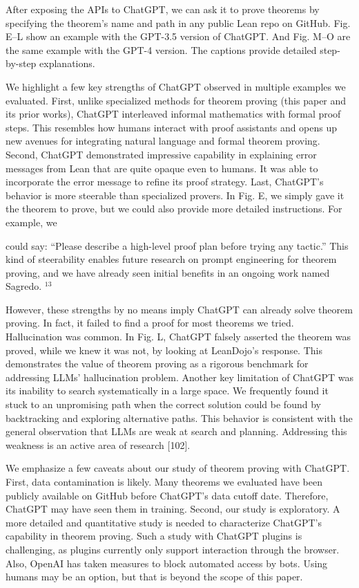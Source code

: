 \documentclass[
]{article}
\begin{document}
After exposing the APIs to ChatGPT, we can ask it to prove theorems by
specifying the theorem's name and path in any public Lean repo on
GitHub. Fig. E--L show an example with the GPT-3.5 version of ChatGPT.
And Fig. M--O are the same example with the GPT-4 version. The captions
provide detailed step-by-step explanations.

We highlight a few key strengths of ChatGPT observed in multiple
examples we evaluated. First, unlike specialized methods for theorem
proving (this paper and its prior works), ChatGPT interleaved informal
mathematics with formal proof steps. This resembles how humans interact
with proof assistants and opens up new avenues for integrating natural
language and formal theorem proving. Second, ChatGPT demonstrated
impressive capability in explaining error messages from Lean that are
quite opaque even to humans. It was able to incorporate the error
message to refine its proof strategy. Last, ChatGPT's behavior is more
steerable than specialized provers. In Fig. E, we simply gave it the
theorem to prove, but we could also provide more detailed instructions.
For example, we

could say: ``Please describe a high-level proof plan before trying any
tactic.'' This kind of steerability enables future research on prompt
engineering for theorem proving, and we have already seen initial
benefits in an ongoing work named Sagredo. \(^{13}\)

However, these strengths by no means imply ChatGPT can already solve
theorem proving. In fact, it failed to find a proof for most theorems we
tried. Hallucination was common. In Fig. L, ChatGPT falsely asserted the
theorem was proved, while we knew it was not, by looking at LeanDojo's
response. This demonstrates the value of theorem proving as a rigorous
benchmark for addressing LLMs' hallucination problem. Another key
limitation of ChatGPT was its inability to search systematically in a
large space. We frequently found it stuck to an unpromising path when
the correct solution could be found by backtracking and exploring
alternative paths. This behavior is consistent with the general
observation that LLMs are weak at search and planning. Addressing this
weakness is an active area of research {[}102{]}.

We emphasize a few caveats about our study of theorem proving with
ChatGPT. First, data contamination is likely. Many theorems we evaluated
have been publicly available on GitHub before ChatGPT's data cutoff
date. Therefore, ChatGPT may have seen them in training. Second, our
study is exploratory. A more detailed and quantitative study is needed
to characterize ChatGPT's capability in theorem proving. Such a study
with ChatGPT plugins is challenging, as plugins currently only support
interaction through the browser. Also, OpenAI has taken measures to
block automated access by bots. Using humans may be an option, but that
is beyond the scope of this paper.
\end{document}
